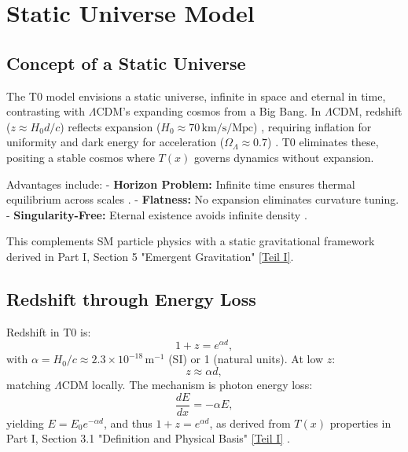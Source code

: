 \documentclass[twocolumn,aps,prl]{revtex4-2}
\newcommand{\Tfield}{T(x)}
\newcommand{\LCDM}{\Lambda\text{CDM}}
\begin{document}
	\section{Static Universe Model}
	\label{sec:static_universe}
	
	\subsection{Concept of a Static Universe}
	\label{subsec:static_concept}
	
	The T0 model envisions a static universe, infinite in space and eternal in time, contrasting with \(\LCDM\)’s expanding cosmos from a Big Bang. In \(\LCDM\), redshift (\(z \approx H_0 d / c\)) reflects expansion (\(H_0 \approx 70 \, \text{km/s/Mpc}\)) \cite{Planck2020}, requiring inflation for uniformity and dark energy for acceleration (\(\Omega_{\Lambda} \approx 0.7\)) \cite{Riess1998}. T0 eliminates these, positing a stable cosmos where \(\Tfield\) governs dynamics without expansion.
	
	Advantages include:
	- \textbf{Horizon Problem:} Infinite time ensures thermal equilibrium across scales \cite{pascher_messdifferenzen_2025}.
	- \textbf{Flatness:} No expansion eliminates curvature tuning.
	- \textbf{Singularity-Free:} Eternal existence avoids infinite density \cite{pascher_perspective_2025}.
	
	This complements SM particle physics with a static gravitational framework derived in Part I, Section 5 "Emergent Gravitation" \href{https://github.com/jpascher/T0-Time-Mass-Duality/tree/main/2/pdf/English/QMRelTimeMassPart1En.pdf}{[Teil I]}.
	
	\subsection{Redshift through Energy Loss}
	\label{subsec:redshift_energy_loss}
	
	Redshift in T0 is:
	\begin{equation}
		1 + z = e^{\alpha d},
		\label{eq:redshift_distance}
	\end{equation}
	with \(\alpha = H_0 / c \approx 2.3 \times 10^{-18} \, \text{m}^{-1}\) (SI) or 1 (natural units). At low \(z\):
	\begin{equation}
		z \approx \alpha d,
		\label{eq:hubble_approx}
	\end{equation}
	matching \(\LCDM\) locally. The mechanism is photon energy loss:
	\begin{equation}
		\frac{dE}{dx} = -\alpha E,
		\label{eq:energy_loss_rate}
	\end{equation}
	yielding \(E = E_0 e^{-\alpha d}\), and thus \(1 + z = e^{\alpha d}\), as derived from \(\Tfield\) properties in Part I, Section 3.1 "Definition and Physical Basis" \href{https://github.com/jpascher/T0-Time-Mass-Duality/tree/main/2/pdf/English/QMRelTimeMassPart1En.pdf}{[Teil I]} \cite{pascher_messdifferenzen_2025}.
	
\end{document}
